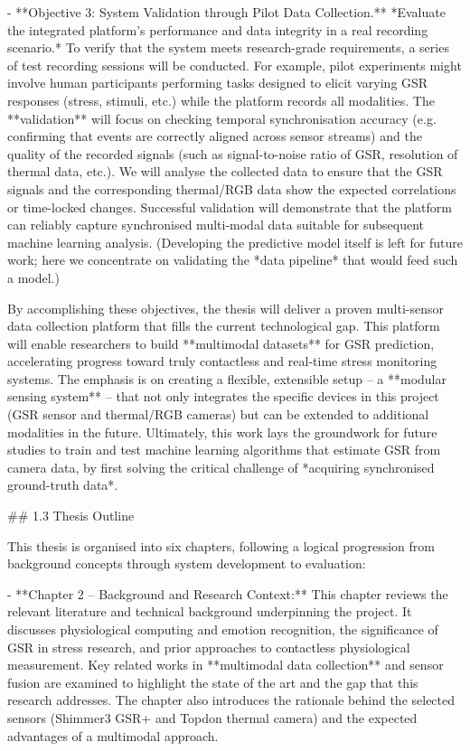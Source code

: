 \documentclass[12pt,a4paper]{article}
\begin{document}
- **Objective 3: System Validation through Pilot Data Collection.**
  *Evaluate the integrated platform's performance and data integrity in
  a real recording scenario.* To verify that the system meets
  research-grade requirements, a series of test recording sessions will
  be conducted. For example, pilot experiments might involve human
  participants performing tasks designed to elicit varying GSR responses
  (stress, stimuli, etc.) while the platform records all modalities. The
  **validation** will focus on checking temporal synchronisation
  accuracy (e.g. confirming that events are correctly aligned across
  sensor streams) and the quality of the recorded signals (such as
  signal-to-noise ratio of GSR, resolution of thermal data, etc.). We
  will analyse the collected data to ensure that the GSR signals and the
  corresponding thermal/RGB data show the expected correlations or
  time-locked changes. Successful validation will demonstrate that the
  platform can reliably capture synchronised multi-modal data suitable
  for subsequent machine learning analysis. (Developing the predictive
  model itself is left for future work; here we concentrate on
  validating the *data pipeline* that would feed such a model.)

By accomplishing these objectives, the thesis will deliver a proven
multi-sensor data collection platform that fills the current
technological gap. This platform will enable researchers to build
**multimodal datasets** for GSR prediction, accelerating progress toward
truly contactless and real-time stress monitoring systems. The emphasis
is on creating a flexible, extensible setup -- a **modular sensing
system** -- that not only integrates the specific devices in this
project (GSR sensor and thermal/RGB cameras) but can be extended to
additional modalities in the future. Ultimately, this work lays the
groundwork for future studies to train and test machine learning
algorithms that estimate GSR from camera data, by first solving the
critical challenge of *acquiring synchronised ground-truth data*.

## 1.3 Thesis Outline

This thesis is organised into six chapters, following a logical
progression from background concepts through system development to
evaluation:

- **Chapter 2 -- Background and Research Context:** This chapter reviews
  the relevant literature and technical background underpinning the
  project. It discusses physiological computing and emotion recognition,
  the significance of GSR in stress research, and prior approaches to
  contactless physiological measurement. Key related works in
  **multimodal data collection** and sensor fusion are examined to
  highlight the state of the art and the gap that this research
  addresses. The chapter also introduces the rationale behind the
  selected sensors (Shimmer3 GSR+ and Topdon thermal camera) and the
  expected advantages of a multimodal approach.
\end{document}

